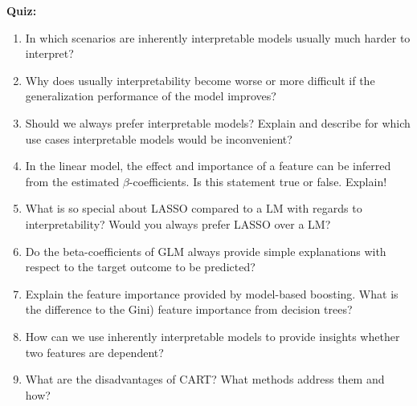 \textbf{Quiz:}
\begin{enumerate}
   	\item In which scenarios are inherently interpretable models usually much harder to interpret?
   	\item Why does usually interpretability become worse or more difficult if the generalization performance of the model improves?
   	\item Should we always prefer interpretable models? Explain and describe for which use cases interpretable models would be inconvenient?
  	\item In the linear model, the effect and importance of a feature can be inferred from the estimated $\beta$-coefficients. Is this statement true or false. Explain!
   	\item What is so special about LASSO compared to a LM with regards to interpretability? Would you always prefer LASSO over a LM?
   	\item Do the beta-coefficients of GLM always provide simple explanations with respect to the target outcome to be predicted? 
   	\item Explain the feature importance provided by model-based boosting. What is the difference to the Gini) feature importance from decision trees?
   	\item How can we use inherently interpretable models to provide insights whether two features are dependent?
   	\item What are the disadvantages of CART? What methods address them and how?
\end{enumerate}